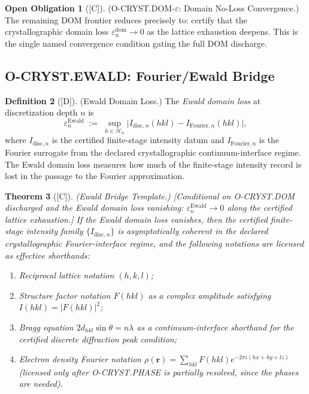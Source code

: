 \documentclass[12pt,oneside]{amsbook}
\theoremstyle{plain}
\newtheorem{theorem}{Theorem}[section]
\theoremstyle{definition}
\newtheorem{definition}[theorem]{Definition}
\newtheorem{obligation}[theorem]{Open Obligation}
\theoremstyle{remark}
\newcommand{\status}[1]{\textup{[#1]}}
\begin{document}
\begin{obligation}[\status{C}]\label{ob:cryst-dom-noloss}
\textup{(O-CRYST.DOM-$\varepsilon$: Domain No-Loss Convergence.)}
The remaining DOM frontier reduces precisely to: certify that
the crystallographic domain loss $\varepsilon^{\mathrm{dom}}_n \to 0$
as the lattice exhaustion deepens.  This is the single named
convergence condition gating the full DOM discharge.
\end{obligation}

\subsection{O-CRYST.EWALD: Fourier/Ewald Bridge}
\label{sec:cryst-EWALD-discharge}

\begin{definition}[\status{D}]\label{def:cryst-ewald-domain-loss}
\textup{(Ewald Domain Loss.)}
The \emph{Ewald domain loss} at discretization depth $n$ is
\[
  \varepsilon^{\mathrm{Ewald}}_n \;:=\;
  \sup_{h \in \mathcal{H}_n}
  \bigl|
    I_{\mathrm{disc},n}(hkl) - I_{\mathrm{Fourier},n}(hkl)
  \bigr|,
\]
where $I_{\mathrm{disc},n}$ is the certified finite-stage
intensity datum and $I_{\mathrm{Fourier},n}$ is the Fourier
surrogate from the declared crystallographic continuum-interface
regime.  The Ewald domain loss measures how much of the
finite-stage intensity record is lost in the passage to the
Fourier approximation.
\end{definition}

\begin{theorem}[\status{C}]\label{thm:cryst-EWALD-template}
\textup{(Ewald Bridge Template.)}
\textup{[Conditional on O-CRYST.DOM discharged and the Ewald
domain loss vanishing: $\varepsilon^{\mathrm{Ewald}}_n \to 0$
along the certified lattice exhaustion.]}
If the Ewald domain loss vanishes, then the certified finite-stage
intensity family $\{I_{\mathrm{disc},n}\}$ is asymptotically
coherent in the declared crystallographic Fourier-interface regime,
and the following notations are licensed as effective shorthands:
\begin{enumerate}[label=\textup{(\arabic*)}]
  \item Reciprocal lattice notation $(h,k,l)$;
  \item Structure factor notation $F(hkl)$ as a complex amplitude
    satisfying $I(hkl) = |F(hkl)|^2$;
  \item Bragg equation $2d_{hkl}\sin\theta = n\lambda$ as a
    continuum-interface shorthand for the certified discrete
    diffraction peak condition;
  \item Electron density Fourier notation
    $\rho(\mathbf{r}) = \sum_{hkl} F(hkl) e^{-2\pi i(hx+ky+lz)}$
    (licensed only after O-CRYST.PHASE is partially resolved, since
    the phases are needed).
\end{enumerate}
\end{theorem}
\end{document}
